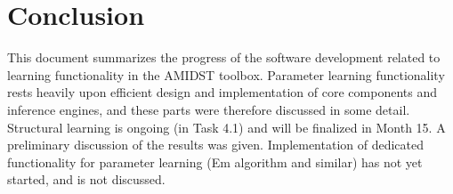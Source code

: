 \documentclass[11pt, oneside]{article}   	%
\begin{document}
 

 
%

\section{Conclusion}

This document summarizes the progress of the software development related to learning functionality in the AMIDST toolbox. Parameter learning functionality rests heavily upon efficient design and implementation of core components and inference engines, and these parts were therefore discussed in some detail. Structural learning is ongoing (in Task 4.1) and will be finalized in Month 15. A preliminary discussion of the results was given.
Implementation of dedicated functionality for parameter learning (Em algorithm and similar) has not yet started, and is not discussed.




\end{document}
